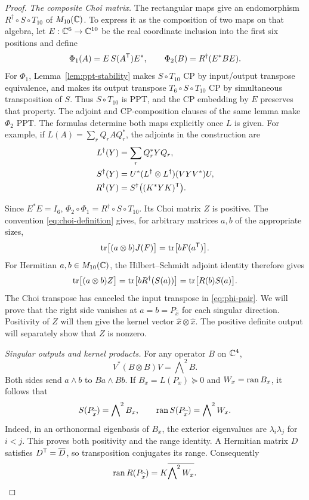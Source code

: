 \begin{proof}
\emph{The composite Choi matrix.}
The rectangular maps give an endomorphism
$R^\dagger\circ S\circ T_{10}$ of $M_{10}(\mathbb C)$.  To express it as the
composition of two maps on that algebra, let
$E:\mathbb C^6\to\mathbb C^{10}$ be the real coordinate inclusion into the first six
positions and define
\begin{equation}
 \Phi_1(A)=E\,S(A^{\mathsf T})E^*,\qquad
 \Phi_2(B)=R^\dagger(E^*BE).
 \label{eq:phi-pair}
\end{equation}
For $\Phi_1$, Lemma~\ref{lem:ppt-stability} makes $S\circ T_{10}$ CP by
input/output transpose equivalence, and makes its output transpose
$T_6\circ S\circ T_{10}$ CP by simultaneous transposition of $S$.
Thus $S\circ T_{10}$ is PPT, and the CP embedding by $E$ preserves that
property.  The adjoint and CP-composition clauses of the same lemma make
$\Phi_2$ PPT.  The formulas determine both maps explicitly once $L$ is
given.  For example, if
$L(A)=\sum_r Q_rAQ_r^*$, the adjoints in the construction are
\begin{align*}
 L^\dagger(Y)&=\sum_r Q_r^*YQ_r,\\
 S^\dagger(Y)&=U^*(L^\dagger\otimes L^\dagger)(VYV^*)U,\\
 R^\dagger(Y)&=S^\dagger\bigl((K^*YK)^{\mathsf T}\bigr).
\end{align*}

Since $E^*E=I_6$,
$\Phi_2\circ\Phi_1=R^\dagger\circ S\circ T_{10}$.  Its Choi matrix $Z$ is
positive.  The convention \eqref{eq:choi-definition} gives, for arbitrary
matrices $a,b$ of the appropriate sizes,
\[
 \operatorname{tr}\bigl[(a\otimes b)J(F)\bigr]=\operatorname{tr}\bigl[bF(a^{\mathsf T})\bigr].
\]
For Hermitian $a,b\in M_{10}(\mathbb C)$, the Hilbert--Schmidt adjoint identity
therefore gives
\begin{equation}
 \operatorname{tr}\bigl[(a\otimes b)Z\bigr]
 =\operatorname{tr}\bigl[bR^\dagger(S(a))\bigr]
 =\operatorname{tr}\bigl[R(b)S(a)\bigr].
 \label{eq:choi-pairing}
\end{equation}
The Choi transpose has canceled the input transpose in
\eqref{eq:phi-pair}.  We will prove that the right side vanishes at
$a=b=P_{\widehat x}$ for each singular direction.  Positivity of $Z$ will
then give the kernel vector $\widehat x\otimes\widehat x$.
The positive definite output will separately show that $Z$ is nonzero.

\emph{Singular outputs and kernel products.}
For any operator $B$ on $\mathbb C^4$,
\[
 V^*(B\otimes B)V=\bigwedge\nolimits^2B.
\]
Both sides send $a\wedge b$ to $Ba\wedge Bb$.  If
$B_x=L(P_x)\succeq0$ and $W_x=\operatorname{ran} B_x$, it follows that
\begin{equation}
 S(P_{\widehat x})=\bigwedge\nolimits^2B_x,\qquad
 \operatorname{ran} S(P_{\widehat x})=\bigwedge\nolimits^2W_x.
 \label{eq:exterior-range}
\end{equation}
Indeed, in an orthonormal eigenbasis of $B_x$, the exterior eigenvalues are
$\lambda_i\lambda_j$ for $i<j$.  This proves both positivity and the range
identity.  A Hermitian matrix $D$ satisfies $D^{\mathsf T}=\overline D$, so
transposition conjugates its range.  Consequently
\begin{equation}
 \operatorname{ran} R(P_{\widehat x})=K\overline{\bigwedge\nolimits^2W_x}.
 \label{eq:complement-range}
\end{equation}


\end{proof}
